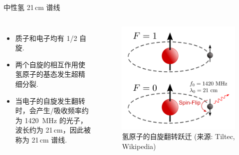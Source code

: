 \documentclass{beamer}
\begin{document}
\begin{frame}{中性氢 21\texorpdfstring{\,}{ }cm 谱线}
  \begin{columns}
    \begin{itemize}
      \item 质子和电子均有 1/2 自旋.
      \item 两个自旋的相互作用使氢原子的基态发生\alert{超精细分裂}.
      \item 当电子的自旋发生翻转时，会产生/吸收频率约为 \SI{1420}{\MHz} 的光子，
        波长约为 21\,cm，因此被称为 \alert{21\,cm 谱线}.
    \end{itemize}

    \begin{figure}
      \centering
      \includegraphics[width=\columnwidth]{hydrogen-spinflip}
      \caption{氢原子的自旋翻转跃迁 (来源: Tiltec, Wikipedia)}
    \end{figure}
  \end{columns}
\end{frame}
\end{document}
